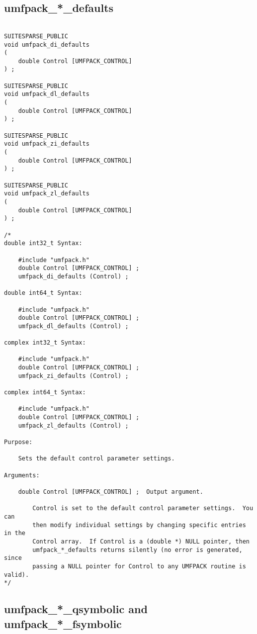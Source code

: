 \documentclass[11pt]{article}
\begin{document}
\subsection{umfpack\_*\_defaults}

{\footnotesize
\begin{verbatim}

SUITESPARSE_PUBLIC
void umfpack_di_defaults
(
    double Control [UMFPACK_CONTROL]
) ;

SUITESPARSE_PUBLIC
void umfpack_dl_defaults
(
    double Control [UMFPACK_CONTROL]
) ;

SUITESPARSE_PUBLIC
void umfpack_zi_defaults
(
    double Control [UMFPACK_CONTROL]
) ;

SUITESPARSE_PUBLIC
void umfpack_zl_defaults
(
    double Control [UMFPACK_CONTROL]
) ;

/*
double int32_t Syntax:

    #include "umfpack.h"
    double Control [UMFPACK_CONTROL] ;
    umfpack_di_defaults (Control) ;

double int64_t Syntax:

    #include "umfpack.h"
    double Control [UMFPACK_CONTROL] ;
    umfpack_dl_defaults (Control) ;

complex int32_t Syntax:

    #include "umfpack.h"
    double Control [UMFPACK_CONTROL] ;
    umfpack_zi_defaults (Control) ;

complex int64_t Syntax:

    #include "umfpack.h"
    double Control [UMFPACK_CONTROL] ;
    umfpack_zl_defaults (Control) ;

Purpose:

    Sets the default control parameter settings.

Arguments:

    double Control [UMFPACK_CONTROL] ;  Output argument.

        Control is set to the default control parameter settings.  You can
        then modify individual settings by changing specific entries in the
        Control array.  If Control is a (double *) NULL pointer, then
        umfpack_*_defaults returns silently (no error is generated, since
        passing a NULL pointer for Control to any UMFPACK routine is valid).
*/
\end{verbatim}
}

\newpage
\subsection{umfpack\_*\_qsymbolic and umfpack\_*\_fsymbolic}
\end{document}
